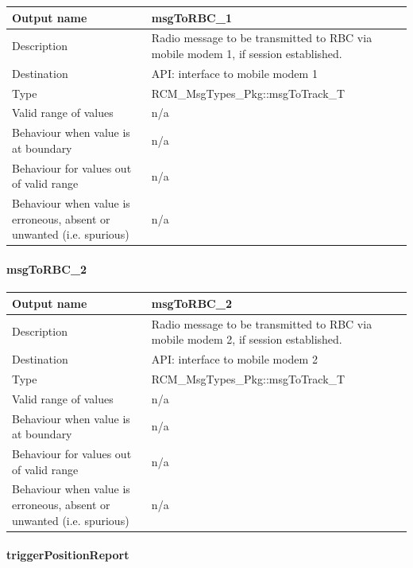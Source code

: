\begin{longtable}{p{}p{}}
	\toprule
	Output name				& msgToRBC\_1 \\
	\midrule
	Description				& Radio message to be transmitted to RBC via mobile modem 1, if session established. \\
	\midrule
	Destination				& API: interface to mobile modem 1 \\ 
	\midrule
	Type					& RCM\_MsgTypes\_Pkg::msgToTrack\_T \\
	\midrule
	Valid range of values	& n/a \\
	\midrule
	Behaviour when value is at boundary	& n/a \\
	\midrule
	Behaviour for values out of valid range	& n/a \\
	\midrule
	Behaviour when value is erroneous, absent or unwanted (i.e. spurious) & n/a \\
	\bottomrule
\end{longtable}

\paragraph{msgToRBC\_2}

\begin{longtable}{p{}p{}}
	\toprule
	Output name				& msgToRBC\_2 \\
	\midrule
	Description				& Radio message to be transmitted to RBC via mobile modem 2, if session established. \\
	\midrule
	Destination				& API: interface to mobile modem 2 \\ 
	\midrule
	Type					& RCM\_MsgTypes\_Pkg::msgToTrack\_T \\
	\midrule
	Valid range of values	& n/a \\
	\midrule
	Behaviour when value is at boundary	& n/a \\
	\midrule
	Behaviour for values out of valid range	& n/a \\
	\midrule
	Behaviour when value is erroneous, absent or unwanted (i.e. spurious) & n/a \\
	\bottomrule
\end{longtable}

\paragraph{triggerPositionReport}

